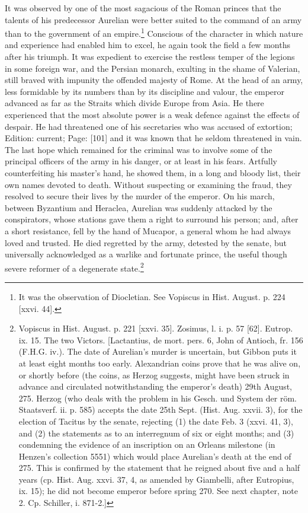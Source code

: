 It was observed by one of the most sagacious of the Roman princes that the talents of his predecessor Aurelian were better suited to the command of an army than to the government of an empire.\footnote{It was the observation of Diocletian. See Vopiscus in Hist. August. p. 224 [xxvi. 44].} Conscious of the character in which nature and experience had enabled him to excel, he again took the field a few months after his triumph. It was expedient to exercise the restless temper of the legions in some foreign war, and the Persian monarch, exulting in the shame of Valerian, still braved with impunity the offended majesty of Rome. At the head of an army, less formidable by its numbers than by its discipline and valour, the emperor advanced as far as the Straits which divide Europe from Asia. He there experienced that the most absolute power is a weak defence against the effects of despair. He had threatened one of his secretaries who was accused of extortion; Edition: current; Page: [101] and it was known that he seldom threatened in vain. The last hope which remained for the criminal was to involve some of the principal officers of the army in his danger, or at least in his fears. Artfully counterfeiting his master\texthebrew{}’s hand, he showed them, in a long and bloody list, their own names devoted to death. Without suspecting or examining the fraud, they resolved to secure their lives by the murder of the emperor. On his march, between Byzantium and Heraclea, Aurelian was suddenly attacked by the conspirators, whose stations gave them a right to surround his person; and, after a short resistance, fell by the hand of Mucapor, a general whom he had always loved and trusted. He died regretted by the army, detested by the senate, but universally acknowledged as a warlike and fortunate prince, the useful though severe reformer of a degenerate state.\footnote{Vopiscus in Hist. August. p. 221 [xxvi. 35]. Zosimus, l. i. p. 57 [62]. Eutrop. ix. 15. The two Victors. [Lactantius, de mort. pers. 6, John of Antioch, fr. 156 (F.H.G. iv.). The date of Aurelian\texthebrew{}’s murder is uncertain, but Gibbon puts it at least eight months too early. Alexandrian coins prove that he was alive on, or shortly before (the coins, as Herzog suggests, might have been struck in advance and circulated notwithstanding the emperor\texthebrew{}’s death) 29th August, 275. Herzog (who deals with the problem in his Gesch. und System der röm. Staatsverf. ii. p. 585) accepts the date 25th Sept. (Hist. Aug. xxvii. 3), for the election of Tacitus by the senate, rejecting (1) the date Feb. 3 (xxvi. 41, 3), and (2) the statements as to an interregnum of six or eight months; and (3) condemning the evidence of an inscription on an Orleans milestone (in Henzen\texthebrew{}’s collection 5551) which would place Aurelian\texthebrew{}’s death at the end of 275. This is confirmed by the statement that he reigned about five and a half years (cp. Hist. Aug. xxvi. 37, 4, as amended by Giambelli, after Eutropius, ix. 15); he did not become emperor before spring 270. See next chapter, note 2. Cp. Schiller, i. 871-2.]}


